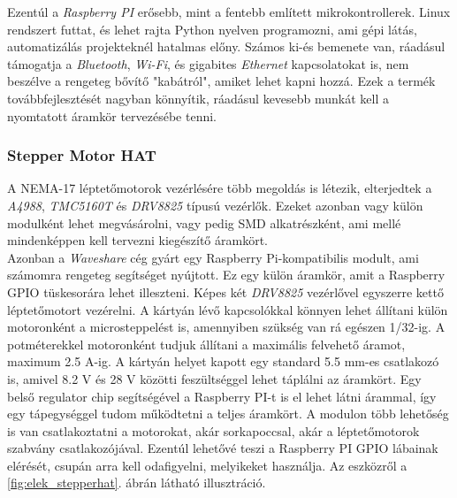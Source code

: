 \documentclass[12pt,a4paper]{article}
\begin{document}
Ezentúl a \textsl{Raspberry PI} erősebb, mint a fentebb említett mikrokontrollerek. Linux rendszert futtat, és lehet rajta Python nyelven programozni, ami gépi látás, automatizálás projekteknél hatalmas előny. Számos ki-és bemenete van, ráadásul támogatja a \textsl{Bluetooth}, \textsl{Wi-Fi}, és gigabites \textsl{Ethernet} kapcsolatokat is, nem beszélve a rengeteg bővítő "kabátról", amiket lehet kapni hozzá. Ezek a termék továbbfejlesztését nagyban könnyítik, ráadásul kevesebb munkát kell a nyomtatott áramkör tervezésébe tenni. \cite{raspberry4}

\subsubsection*{Stepper Motor HAT}
A NEMA-17 léptetőmotorok vezérlésére több megoldás is létezik, elterjedtek a \textsl{A4988}, \textsl{TMC5160T} és \textsl{DRV8825} típusú vezérlők. Ezeket azonban vagy külön modulként lehet megvásárolni, vagy pedig SMD alkatrészként, ami mellé mindenképpen kell tervezni kiegészítő áramkört. \\

Azonban a \textsl{Waveshare} cég gyárt egy Raspberry Pi-kompatibilis modult, ami számomra rengeteg segítséget nyújtott. Ez egy külön áramkör, amit a Raspberry GPIO tüskesorára lehet illeszteni. Képes két \textsl{DRV8825} vezérlővel egyszerre kettő léptetőmotort vezérelni. A kártyán lévő kapcsolókkal könnyen lehet állítani külön motoronként a microsteppelést is, amennyiben szükség van rá egészen 1/32-ig. A potméterekkel motoronként tudjuk állítani a maximális felvehető áramot, maximum 2.5 A-ig. A kártyán helyet kapott egy standard 5.5 mm-es csatlakozó is, amivel 8.2 V és 28 V közötti feszültséggel lehet táplálni az áramkört. Egy belső regulator chip segítségével a Raspberry PI-t is el lehet látni árammal, így egy tápegységgel tudom működtetni a teljes áramkört. A modulon több lehetőség is van csatlakoztatni a motorokat, akár sorkapoccsal, akár a léptetőmotorok szabvány csatlakozójával. Ezentúl lehetővé teszi a Raspberry PI GPIO lábainak elérését, csupán arra kell odafigyelni, melyikeket használja. Az eszközről a \ref{fig:elek_stepperhat}. ábrán látható illusztráció. \cite{stepperhat}
\end{document}
